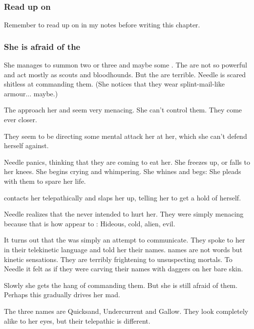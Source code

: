 \begin{garbage}
\subsubsection{Read up on \banes}
Remember to read up on \banes{} in my notes before writing this chapter. 





\subsubsection{She is afraid of the \banes}
She manages to summon two or three \lesserbanes{} and maybe some \banerats. 
The \banerats{} are not so powerful and act mostly as scouts and bloodhounds. 
But the \banes{} are terrible. 
Needle is scared shitless at commanding them. 
(She notices that they wear splint-mail-like armour... maybe.)

The \banes{} approach her and seem very menacing. 
She can't control them. 
They come ever closer. 

They seem to be directing some mental attack her at her, which she can't defend herself against. 

Needle panics, thinking that they are coming to eat her. 
She freezes up, or falls to her knees. 
She begins crying and whimpering. 
She whines and begs: 
She pleads with them to spare her life. 

\Achsah{} contacts her telepathically and slaps her up, telling her to get a hold of herself. 

Needle realizes that the \banes{} never intended to hurt her. 
They were simply menacing because that is how \banes{} appear to \humans: 
Hideous, cold, alien, evil. 

It turns out that the \banesz{}  was simply an attempt to communicate. 
They spoke to her in their telekinetic language and told her their names. 
\Bane{} names are not words but kinetic sensations. 
They are terribly frightening to unsuspecting mortals. 
To Needle it felt as if they were carving their names with daggers on her bare skin. 

Slowly she gets the hang of commanding them. 
But she is still afraid of them. 
Perhaps this gradually drives her mad. 

The three \banesz{} names are Quicksand, Undercurrent and Gallow. 
They look completely alike to her eyes, but their telepathic  is different. 


\end{garbage}
